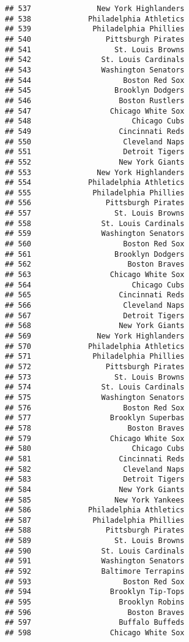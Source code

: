 \documentclass[]{article}
\begin{document}
\begin{verbatim}
## 537               New York Highlanders
## 538             Philadelphia Athletics
## 539              Philadelphia Phillies
## 540                 Pittsburgh Pirates
## 541                   St. Louis Browns
## 542                St. Louis Cardinals
## 543                Washington Senators
## 544                     Boston Red Sox
## 545                   Brooklyn Dodgers
## 546                    Boston Rustlers
## 547                  Chicago White Sox
## 548                       Chicago Cubs
## 549                    Cincinnati Reds
## 550                     Cleveland Naps
## 551                     Detroit Tigers
## 552                    New York Giants
## 553               New York Highlanders
## 554             Philadelphia Athletics
## 555              Philadelphia Phillies
## 556                 Pittsburgh Pirates
## 557                   St. Louis Browns
## 558                St. Louis Cardinals
## 559                Washington Senators
## 560                     Boston Red Sox
## 561                   Brooklyn Dodgers
## 562                      Boston Braves
## 563                  Chicago White Sox
## 564                       Chicago Cubs
## 565                    Cincinnati Reds
## 566                     Cleveland Naps
## 567                     Detroit Tigers
## 568                    New York Giants
## 569               New York Highlanders
## 570             Philadelphia Athletics
## 571              Philadelphia Phillies
## 572                 Pittsburgh Pirates
## 573                   St. Louis Browns
## 574                St. Louis Cardinals
## 575                Washington Senators
## 576                     Boston Red Sox
## 577                  Brooklyn Superbas
## 578                      Boston Braves
## 579                  Chicago White Sox
## 580                       Chicago Cubs
## 581                    Cincinnati Reds
## 582                     Cleveland Naps
## 583                     Detroit Tigers
## 584                    New York Giants
## 585                   New York Yankees
## 586             Philadelphia Athletics
## 587              Philadelphia Phillies
## 588                 Pittsburgh Pirates
## 589                   St. Louis Browns
## 590                St. Louis Cardinals
## 591                Washington Senators
## 592                Baltimore Terrapins
## 593                     Boston Red Sox
## 594                  Brooklyn Tip-Tops
## 595                    Brooklyn Robins
## 596                      Boston Braves
## 597                    Buffalo Buffeds
## 598                  Chicago White Sox

\end{verbatim}
\end{document}
